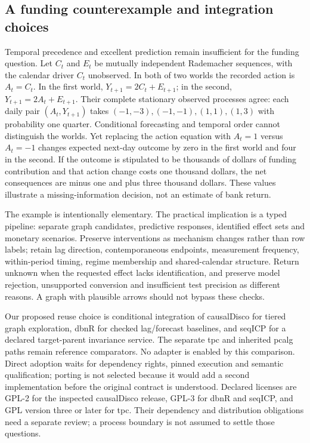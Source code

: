 \subsection{A funding counterexample and integration choices}

Temporal precedence and excellent prediction remain insufficient for the funding
question. Let \(C_t\) and \(E_t\) be mutually independent Rademacher sequences,
with the calendar driver \(C_t\) unobserved. In both of two worlds the recorded
action is \(A_t=C_t\). In the first world,
\(Y_{t+1}=2C_t+E_{t+1}\); in the second,
\(Y_{t+1}=2A_t+E_{t+1}\). Their complete stationary observed processes agree:
each daily pair \((A_t,Y_{t+1})\) takes
\((-1,-3),(-1,-1),(1,1),(1,3)\) with probability one quarter. Conditional
forecasting and temporal order cannot distinguish the worlds. Yet replacing
the action equation with \(A_t=1\) versus \(A_t=-1\) changes expected next-day
outcome by zero in the first world and four in the second. If the outcome is
stipulated to be thousands of dollars of funding contribution and that action
change costs one thousand dollars, the net consequences are minus one and plus
three thousand dollars. These values illustrate a missing-information decision,
not an estimate of bank return. \citep{exec14_rtime_exact}

The example is intentionally elementary. The practical implication is a typed
pipeline: separate graph candidates, predictive responses, identified effect
sets and monetary scenarios. Preserve interventions as mechanism changes rather
than row labels; retain lag direction, contemporaneous endpoints, measurement
frequency, within-period timing, regime membership and shared-calendar structure.
Return unknown when the requested effect lacks identification, and preserve
model rejection, unsupported conversion and insufficient test precision as
different reasons. A graph with plausible arrows should not bypass these checks.
\citep{exec14_rtime_contract}

Our proposed reuse choice is conditional integration of causalDisco for tiered
graph exploration, dbnR for checked lag/forecast baselines, and seqICP for a
declared target-parent invariance service. The separate tpc and inherited pcalg
paths remain reference comparators. No adapter is enabled by this comparison.
Direct adoption waits for dependency rights, pinned execution and semantic
qualification; porting is not selected because it would add a second
implementation before the original contract is understood. Declared licenses
are GPL-2 for the inspected causalDisco release, GPL-3 for dbnR and seqICP,
and GPL version three or later for tpc. Their dependency and distribution
obligations need a separate review; a process boundary is not assumed to settle
those questions. \citep{exec14_rtime_causaldisco,exec14_rtime_dbnr,exec14_rtime_seqicp,exec14_rtime_tpc,exec14_rtime_contract}

